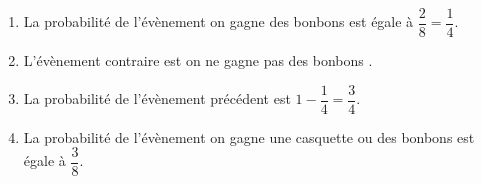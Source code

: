 
\medskip

%
%
%
%	
\begin{enumerate}
\item La probabilité de l'évènement \og on gagne des bonbons \fg{} est égale à $\dfrac{2}{8} = \dfrac{1}{4}$.
\item L'évènement contraire est \og on ne gagne pas des bonbons \fg.
\item La probabilité de l'évènement précédent est $1 - \dfrac{1}{4} = \dfrac{3}{4}$.
\item La probabilité de l'évènement \og on gagne une casquette ou des bonbons \fg{} est égale à $\dfrac{3}{8}$.
\end{enumerate}
 
 
\vspace{0,5cm}

